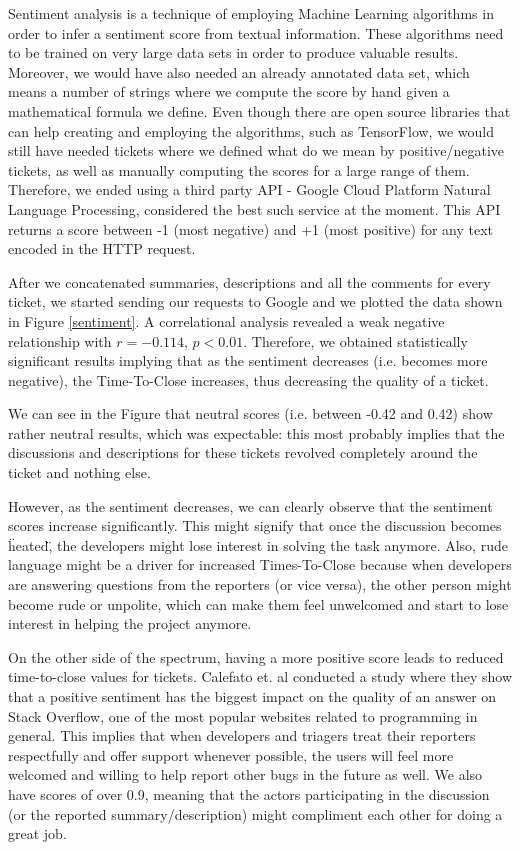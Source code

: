 \documentclass{mpaper}
\begin{document}
Sentiment analysis is a technique of employing Machine Learning algorithms in order to infer a sentiment 
score from textual information. These algorithms need to be trained on very large data sets in order to 
produce valuable results. Moreover, we would have also needed an already annotated data set, which means 
a number of strings where we compute the score by hand given a mathematical formula we define. Even though 
there are open source libraries that can help creating and employing the algorithms, such as TensorFlow, 
we would still have needed tickets where we defined what do we mean by positive/negative tickets, as well as
manually computing the scores for a large range of them. Therefore, we ended using a third party API - Google 
Cloud Platform Natural Language Processing, considered the best such service at the moment. This API returns 
a score between -1 (most negative) and +1 (most positive) for any text encoded in the HTTP request.

After we concatenated summaries, descriptions and all the comments for every ticket, we started sending our 
requests to Google and we plotted the data shown in Figure \ref{sentiment}. A correlational analysis revealed a 
weak negative relationship with $r = -0.114$, $p < 0.01$. Therefore, we obtained statistically significant 
results implying that as the sentiment decreases (i.e. becomes more negative), the Time-To-Close increases, thus 
decreasing the quality of a ticket.

We can see in the Figure that neutral scores (i.e. between -0.42 and 0.42) show rather neutral results, which 
was expectable: this most probably implies that the discussions and descriptions for these tickets revolved 
completely around the ticket and nothing else. 

However, as the sentiment decreases, we can clearly observe that the sentiment scores increase significantly. 
This might signify that once the discussion becomes \"heated\", the developers might lose interest in solving 
the task anymore. Also, rude language might be a driver for increased Times-To-Close because when developers are 
answering questions from the reporters (or vice versa), the other person might become rude or unpolite, which can 
make them feel unwelcomed and start to lose interest in helping the project anymore. 

On the other side of the spectrum, having a more positive score leads to reduced time-to-close values for tickets. Calefato et. al 
\cite{calefato2015mining} conducted a study where they show that a positive sentiment has the biggest impact on 
the quality of an answer on Stack Overflow, one of the most popular websites related to programming in general. This 
implies that when developers and triagers treat their reporters respectfully and offer support whenever possible, 
the users will feel more welcomed and willing to help report other bugs in the future as well. We also have scores of 
over 0.9, meaning that the actors participating in the discussion (or the reported summary/description) might compliment 
each other for doing a great job.
\end{document}
